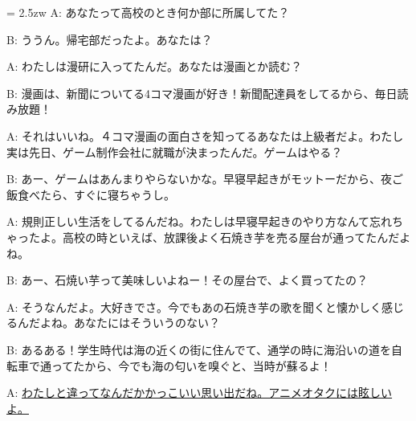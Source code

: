 \documentclass[11pt]{amsart}
\title{}
\author{}
\newenvironment{hangall}[1]{\hangindent = 2.5zw\everypar{\hangindent = 2.5zw}}{}
\begin{document}
\maketitle
\begin{hangall}{}%
A: あなたって高校のとき何か部に所属してた？

B: ううん。帰宅部だったよ。あなたは？

A: わたしは漫研に入ってたんだ。あなたは漫画とか読む？

B: 漫画は、新聞についてる4コマ漫画が好き！新聞配達員をしてるから、毎日読み放題！

A: それはいいね。４コマ漫画の面白さを知ってるあなたは上級者だよ。わたし実は先日、ゲーム制作会社に就職が決まったんだ。ゲームはやる？

B: あー、ゲームはあんまりやらないかな。早寝早起きがモットーだから、夜ご飯食べたら、すぐに寝ちゃうし。

A: 規則正しい生活をしてるんだね。わたしは早寝早起きのやり方なんて忘れちゃったよ。高校の時といえば、放課後よく石焼き芋を売る屋台が通ってたんだよね。

B: あー、石焼い芋って美味しいよねー！その屋台で、よく買ってたの？

A: そうなんだよ。大好きでさ。今でもあの石焼き芋の歌を聞くと懐かしく感じるんだよね。あなたにはそういうのない？

B: あるある！学生時代は海の近くの街に住んでて、通学の時に海沿いの道を自転車で通ってたから、今でも海の匂いを嗅ぐと、当時が蘇るよ！

A: \ul{わたしと違ってなんだかかっこいい思い出だね。アニメオタクには眩しいよ。}\end{hangall}
\end{document}

